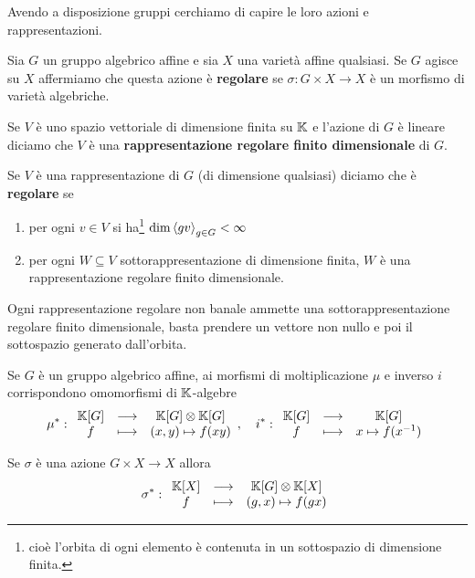 Avendo a disposizione gruppi cerchiamo di capire le loro azioni e rappresentazioni.

\begin{definition}
Sia $G$ un gruppo algebrico affine e sia $X$ una variet\`a affine qualsiasi. Se $G$ agisce su $X$ affermiamo che questa azione \`e \textbf{regolare} se $\sigma:G\times X\to X$ \`e un morfismo di variet\`a algebriche.
\end{definition}

\begin{definition}
Se $V$ \`e uno spazio vettoriale di dimensione finita su $\mathbb{K}$ e l'azione di $G$ \`e lineare diciamo che $V$ \`e una \textbf{rappresentazione regolare finito dimensionale} di $G$.

Se $V$ \`e una rappresentazione di $G$ (di dimensione qualsiasi) diciamo che \`e \textbf{regolare} se
\begin{enumerate}
    \item per ogni $v\in V$ si ha\footnote{cio\`e l'orbita di ogni elemento \`e contenuta in un sottospazio di dimensione finita.} $\dim\left\langle {gv}\right\rangle_{g\in G}<\infty$
    \item per ogni $W\subseteq V$ sottorappresentazione di dimensione finita, $W$ \`e una rappresentazione regolare finito dimensionale.
\end{enumerate}
\end{definition}

\begin{remark}
Ogni rappresentazione regolare non banale ammette una sottorappresentazione regolare finito dimensionale, basta prendere un vettore non nullo e poi il sottospazio generato dall'orbita.
\end{remark}


\begin{remark}
Se $G$ \`e un gruppo algebrico affine, ai morfismi di moltiplicazione $\mu$ e inverso $i$ corrispondono omomorfismi di $\mathbb{K}$-algebre
\[\mu^\ast:\begin{array}{ccc} {\mathbb{K}[G]} & \longrightarrow & {\mathbb{K}[G]\otimes\mathbb{K}[G]}\\ {f} & \longmapsto & {(x,y)\mapsto f(xy)} \end{array},\quad i^\ast:\begin{array}{ccc} {\mathbb{K}[G]} & \longrightarrow & {\mathbb{K}[G]}\\ {f} & \longmapsto & {x\mapsto f(x^{-1})} \end{array}\]
\end{remark}

\begin{remark}
Se $\sigma$ \`e una azione $G\times X\to X$ allora
\[\sigma^\ast:\begin{array}{ccc} {\mathbb{K}[X]} & \longrightarrow & {\mathbb{K}[G]\otimes\mathbb{K}[X]}\\ {f} & \longmapsto & {(g,x)\mapsto f(gx)} \end{array}\]
\end{remark}


